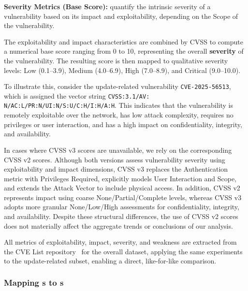 \documentclass[fleqn,s1,names,tex]{neptune}
\begin{document}
 


\cvpt\textbf{Severity Metrics (Base Score):}
 quantify the intrinsic severity of a vulnerability based on its impact and exploitability, depending on the Scope of the vulnerability. 


The exploitability and impact characteristics are combined by CVSS to compute a numerical base score ranging from 0 to 10, representing the overall \textbf{severity} of the vulnerability.
The resulting score is then mapped to qualitative severity levels: Low (0.1--3.9), Medium (4.0--6.9), High (7.0--8.9), and Critical (9.0--10.0). 













To illustrate this, consider the update-related vulnerability \texttt{CVE-2025-56513}, which is assigned the vector string
\texttt{CVSS:3.1/AV:} \ubrk \texttt{N/AC:L/PR:N/UI:N/S:U/C:H/I:H/A:H}.
This indicates that the vulnerability is remotely exploitable over the network, has low attack complexity, requires no privileges or user interaction, and has a high impact on confidentiality, integrity, and availability. 





In cases where CVSS v3 scores are unavailable, we rely on the corresponding CVSS v2 scores. Although both versions assess vulnerability severity using exploitability and impact dimensions, CVSS v3 
 replaces the Authentication metric with Privileges Required, explicitly models User Interaction and Scope, and extends the Attack Vector to include physical access. 
In addition, CVSS v2 represents impact using coarse None/Partial/Complete levels, whereas CVSS v3 adopts more granular None/Low/High assessments for confidentiality, integrity, and availability. 
Despite these structural differences, 
 the use of CVSS v2 scores does not materially affect the aggregate trends or conclusions of our analysis.



All metrics of exploitability, impact, severity, and weakness are extracted
from the CVE List repository~\citep{CVE_Program,CVE_List_V5} for the overall
dataset, applying the same experiments to the update-related subset, enabling a
direct, like-for-like comparison.


\subsubsection{Mapping {}s to {}s}
\end{document}
